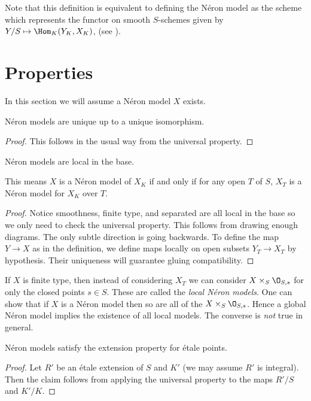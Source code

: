 \documentclass[11pt]{article}
\newcommand{\neron}{N\'{e}ron }
\newcommand{\etale}{\'{e}tale }
\begin{document}
Note that this definition is equivalent to defining the \neron model as the scheme which represents the functor on smooth $S$-schemes given by $Y/S \mapsto \Hom_K(Y_K, X_K)$, (see \cite[Rem.~17.2]{milneAV}).

\section{Properties}

In this section we will assume a \neron model $X$ exists.

\begin{prop}
	\neron models are unique up to a unique isomorphism.
\end{prop}
\begin{proof}
	This follows in the usual way from the universal property.
\end{proof}

\begin{prop}
	\neron models are local in the base.
	
	This means $X$ is a \neron model of $X_K$ if and only if for any open $T$ of $S$, $X_{T}$ is a \neron model for $X_K$ over $T$.
\end{prop}
\begin{proof}
	Notice smoothness, finite type, and separated are all local in the base so we only need to check the universal property. This follows from drawing enough diagrams. The only subtle direction is going backwards. To define the map $Y \to X$ as in the definition, we define maps locally on open subsets $Y_T \to X_T$ by hypothesis. Their uniqueness will guarantee gluing compatibility.
\end{proof}

\begin{rem}
	If $X$ is finite type, then instead of considering $X_T$ we can consider $X \times_S \O_{S,s}$ for only the closed points $s\in S$. These are called the \emph{local \neron models}. One can show that if $X$ is a \neron model then so are all of the $X\times_S \O_{S,s}$. Hence a global \neron model implies the existence of all local models. The converse is \emph{not} true in general.
\end{rem}

\begin{prop}
	\neron models satisfy the extension property for \etale points.
\end{prop}
\begin{proof}
	Let $R'$ be an \etale extension of $S$ and $K'$ (we may assume $R'$ is integral). Then the claim follows from applying the universal property to the maps $R'/S$ and $K'/K$.
	
\end{proof}
\end{document}
